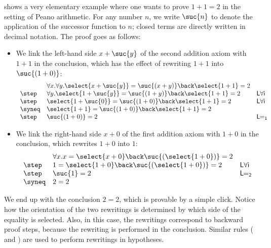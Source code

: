  shows a very elementary example where one wants to
prove $1+1=2$ in the setting of Peano arithmetic. For any number $n$, we write
$\suc{n}$ to denote the application of the successor function to $n$; closed
terms are directly written in decimal notation. The proof goes as
follows:
\begin{itemize}
  \item We link the left-hand side $x + \suc{y}$ of the second addition axiom with $1 + 1$ in the conclusion, which has the effect of rewriting $1 + 1$ into $\suc{(1 + 0)}$:
    $$
      \begin{array}{lll}
        & \forall x. \forall y. \select{x + \suc{y}} = \suc{(x + y)} \back \select{1 + 1} = 2 & \\
        \step & \forall y. \select{1 + \suc{y}} = \suc{(1 + y)} \back \select{1 + 1} = 2 &\mathsf{L\forall i} \\
        \step & \select{1 + \suc{0}} = \suc{(1 + 0)} \back \select{1 + 1} = 2 &\mathsf{L\forall i} \\
        \syneq & \select{1 + 1} = \suc{(1 + 0)} \back \select{1 + 1} = 2 & \\
        \step & \suc{(1 + 0)} = 2 &\mathsf{L\!\!=_1}
      \end{array}
    $$
  \item We link the right-hand side $x + 0$ of the first addition axiom with $1 + 0$ in the conclusion, which rewrites $1 + 0$ into $1$:
    $$
      \begin{array}{lll}
        & \forall x. x = \select{x + 0} \back \suc{(\select{1 + 0})} = 2 & \\
        \step & 1 = \select{1 + 0} \back \suc{(\select{1 + 0})} = 2 &\mathsf{L\forall i} \\
        \step & \suc{1} = 2 &\mathsf{L\!\!=_2} \\
        \syneq & 2 = 2 &
      \end{array}
    $$
\end{itemize}

We end up with the conclusion $2 = 2$, which is provable by a simple click.
Notice how the orientation of the two rewritings is determined by which side of
the equality is selected. Also, in this case, the rewritings
correspond to backward proof steps, because the rewriting is performed
in the conclusion. Similar rules ( and ) are
used to perform rewritings in hypotheses.



